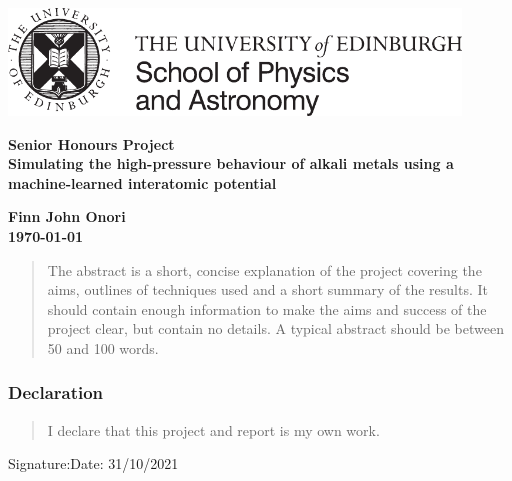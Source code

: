 \documentclass[a4paper,12pt]{article}
\begin{document}
\pagestyle{empty}                       %

\par\noindent\includegraphics[width=12cm]{PandA_crest.pdf}

\par\noindent                                           %
\vspace*{2cm}
\begin{center}
        \Large\bf \Large\bf Senior Honours Project\\
        \LARGE\bf Simulating the high-pressure behaviour of alkali metals using a machine-learned interatomic potential
\end{center}
\vspace*{0.5cm}
\begin{center}
        \bf Finn John Onori\\
        \today
\end{center}
\vspace*{5mm}
%
\begin{abstract}
        The abstract is a short, concise explanation of the project
        covering the aims, outlines of techniques used and a short
        summary of the results. It should contain enough information to
        make the aims and success of the project clear, but contain no details.
        A typical abstract should be between 50 and 100 words.
\end{abstract}

\vspace*{1cm}

\subsubsection*{Declaration}

\begin{quotation}
  I declare that this project and report is my own work.
\end{quotation}

\vspace*{2cm}
Signature:\hspace*{8cm}Date:  31/10/2021         %
\end{document}
